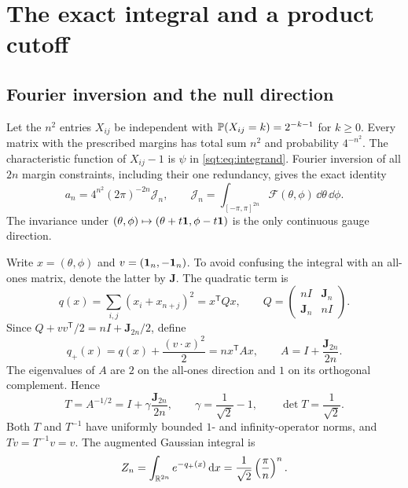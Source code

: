 \section{The exact integral and a product cutoff}\label{sqt:sec:gauge}
\subsection{Fourier inversion and the null direction}
Let the $n^2$ entries $X_{ij}$ be independent with
$\mathbb P(X_{ij}=k)=2^{-k-1}$ for $k\geq0$. Every matrix with the prescribed margins has total sum $n^2$ and probability $4^{-n^2}$. The characteristic function of $X_{ij}-1$ is $\psi$ in \eqref{sqt:eq:integrand}. Fourier inversion of all $2n$ margin constraints, including their one redundancy, gives the exact identity
\begin{equation}\label{sqt:eq:fourier}
a_n=4^{n^2}(2\pi)^{-2n}\mathcal J_n,\qquad
\mathcal J_n=\int_{[-\pi,\pi]^{2n}}\mathcal F(\theta,\phi)\,\dd\theta\,\dd\phi.
\end{equation}
The invariance under $(\theta,\phi)\mapsto(\theta+t\mathbf 1,\phi-t\mathbf 1)$ is the only continuous gauge direction.

Write $x=(\theta,\phi)$ and $v=(\mathbf 1_n,-\mathbf 1_n)$. To avoid confusing the integral with an all-ones matrix, denote the latter by $\mathbf J$. The quadratic term is
\[
q(x)=\sum_{i,j}(x_i+x_{n+j})^2=x^{\mathsf T}Qx,
\qquad Q=\begin{pmatrix}nI&\mathbf J_n\\\mathbf J_n&nI\end{pmatrix}.
\]
Since $Q+vv^{\mathsf T}/2=nI+\mathbf J_{2n}/2$, define
\begin{equation}\label{sqt:eq:augmented}
q_+(x)=q(x)+\frac{(v\cdot x)^2}{2}=nx^{\mathsf T}Ax,
\qquad A=I+\frac{\mathbf J_{2n}}{2n}.
\end{equation}
The eigenvalues of $A$ are $2$ on the all-ones direction and $1$ on its orthogonal complement. Hence
\begin{equation}\label{sqt:eq:whitening}
T=A^{-1/2}=I+\gamma\frac{\mathbf J_{2n}}{2n},
\qquad\gamma=\frac1{\sqrt2}-1,\qquad\det T=\frac1{\sqrt2}.
\end{equation}
Both $T$ and $T^{-1}$ have uniformly bounded $1$- and infinity-operator norms, and $Tv=T^{-1}v=v$. The augmented Gaussian integral is
\begin{equation}\label{sqt:eq:Zn}
Z_n=\int_{\mathbb R^{2n}}e^{-q_+(x)}\,\mathrm d x=\frac1{\sqrt2}\left(\frac\pi n\right)^n.
\end{equation}

